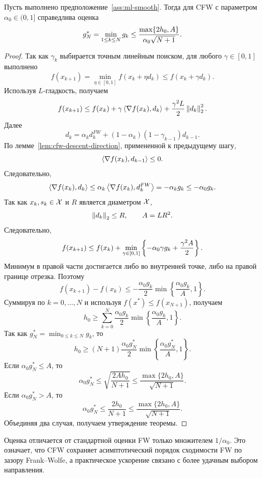 \begin{theorem}
\label{thm:cfw-rate}
Пусть выполнено предположение~\ref{ass:ml-smooth}.
Тогда для CFW с параметром $\alpha_0\in(0,1]$ справедлива оценка
\[
    g_N^\ast
    =
    \min\limits_{1\leq k\leq N}g_k
    \leq
    \frac{\max\{2h_0,A\}}{\alpha_0\sqrt{N+1}}.
\]
\end{theorem}

\begin{proof}
Так как $\gamma_k$ выбирается точным линейным поиском, для любого $\gamma\in[0,1]$
выполнено
\[
    f(x_{k+1})
    =
    \min_{\eta\in[0,1]}f(x_k+\eta d_k)
    \leq
    f(x_k+\gamma d_k).
\]
Используя $L$-гладкость, получаем
\[
    f(x_{k+1})
    \leq
    f(x_k)
    +
    \gamma\left\langle \nabla f(x_k), d_k \right\rangle
    +
    \frac{\gamma^2L}{2}\left\|d_k\right\|_2^2.
\]
Далее
\[
    d_k
    =
    \alpha_k d_k^{FW}
    +
    (1-\alpha_k)(1-\gamma_{k-1})d_{k-1}.
\]
По лемме~\ref{lem:cfw-descent-direction}, примененной к предыдущему шагу,
\[
    \left\langle \nabla f(x_k), d_{k-1} \right\rangle\leq 0.
\]
Следовательно,
\[
    \left\langle \nabla f(x_k), d_k \right\rangle
    \leq
    \alpha_k\left\langle \nabla f(x_k), d_k^{FW} \right\rangle
    =
    -\alpha_k g_k
    \leq
    -\alpha_0 g_k.
\]
Так как $x_k,s_k\in\mathcal{X}$ и $R$ является диаметром $\mathcal{X}$,
\[
    \left\|d_k\right\|_2\leq R,
    \qquad
    A=LR^2.
\]
Следовательно,
\[
    f(x_{k+1})
    \leq
    f(x_k)
    +
    \min\limits_{\gamma\in[0,1]}
    \left\{
        -\alpha_0\gamma g_k
        +
        \frac{\gamma^2A}{2}
    \right\}.
\]
Минимум в правой части достигается либо во внутренней точке,
либо на правой границе отрезка.
Поэтому
\[
    f(x_{k+1})-f(x_k)
    \leq
    -\frac{\alpha_0g_k}{2}
    \min\left\{
        \frac{\alpha_0g_k}{A},
        1
    \right\}.
\]
Суммируя по $k=0,\ldots,N$ и используя $f(x^\ast)\leq f(x_{N+1})$, получаем
\[
    h_0
    \geq
    \sum_{k=0}^{N}
    \frac{\alpha_0g_k}{2}
    \min\left\{
        \frac{\alpha_0g_k}{A},
        1
    \right\}.
\]
Так как $g_N^\ast=\min_{0\leq k\leq N}g_k$, то
\[
    h_0
    \geq
    (N+1)
    \frac{\alpha_0g_N^\ast}{2}
    \min\left\{
        \frac{\alpha_0g_N^\ast}{A},
        1
    \right\}.
\]
Если $\alpha_0g_N^\ast\leq A$, то
\[
    \alpha_0g_N^\ast
    \leq
    \sqrt{\frac{2Ah_0}{N+1}}
    \leq
    \frac{\max\{2h_0,A\}}{\sqrt{N+1}}.
\]
Если $\alpha_0g_N^\ast>A$, то
\[
    \alpha_0g_N^\ast
    \leq
    \frac{2h_0}{N+1}
    \leq
    \frac{\max\{2h_0,A\}}{\sqrt{N+1}}.
\]
Объединяя два случая, получаем утверждение теоремы.
\end{proof}

Оценка отличается от стандартной оценки FW только множителем $1/\alpha_0$.
Это означает, что CFW сохраняет асимптотический порядок сходимости FW по зазору Frank--Wolfe, а практическое ускорение связано с более удачным выбором направления.

